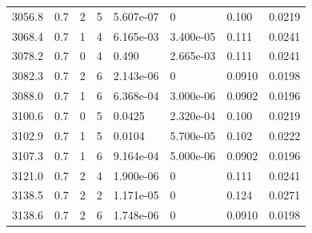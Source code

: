 \documentclass[preview]{standalone}
\begin{document}
{{{{{{{\begin{tabular}{L{1.2cm}C{1.2cm} C{0.3cm}C{0.5cm} C{1.4cm}C{1.4cm} C{1.4cm}C{1.4cm}}
  3056.8  &   0.7  & 2     &  5 &  5.607e-07  & 0  & 0.100 &  0.0219   \\ 
  3068.4  &   0.7  & 1     &  4 &  6.165e-03  & 3.400e-05  & 0.111 &  0.0241   \\ 
  3078.2  &   0.7  & 0     &  4 &  0.490  & 2.665e-03  & 0.111 &  0.0241   \\ 
  3082.3  &   0.7  & 2     &  6 &  2.143e-06  & 0  & 0.0910 &  0.0198   \\ 
  3088.0  &   0.7  & 1     &  6 &  6.368e-04  & 3.000e-06  & 0.0902 &  0.0196   \\ 
  3100.6  &   0.7  & 0     &  5 &  0.0425  & 2.320e-04  & 0.100 &  0.0219   \\ 
  3102.9  &   0.7  & 1     &  5 &  0.0104  & 5.700e-05  & 0.102 &  0.0222   \\ 
  3107.3  &   0.7  & 1     &  6 &  9.164e-04  & 5.000e-06  & 0.0902 &  0.0196   \\ 
  3121.0  &   0.7  & 2     &  4 &  1.900e-06  & 0  & 0.111 &  0.0241   \\ 
  3138.5  &   0.7  & 2     &  2 &  1.171e-05  & 0  & 0.124 &  0.0271   \\ 
  3138.6  &   0.7  & 2     &  6 &  1.748e-06  & 0  & 0.0910 &  0.0198   \\ 
\hline 
\end{tabular} 

}}}}}}}
\end{document}
